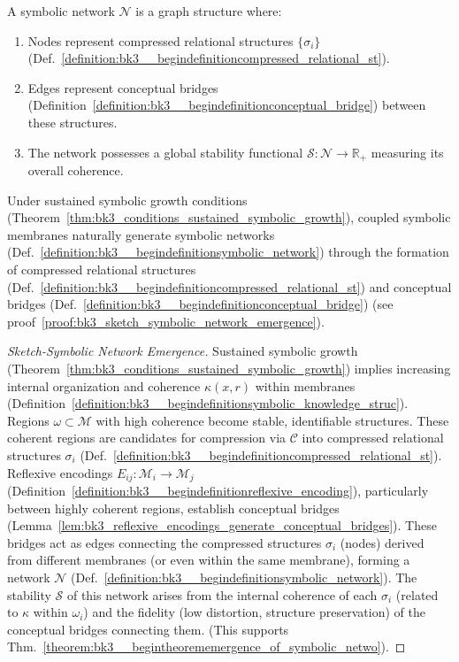 \begin{definition} \label{definition:bk3__begindefinitionsymbolic_network}
A symbolic network $\mathcal{N}$ is a graph structure where:
\begin{enumerate}
    \item Nodes represent compressed relational structures $\{\sigma_i\}$ (Def.~\ref{definition:bk3__begindefinitioncompressed_relational_st}).
    \item Edges represent conceptual bridges (Definition~\ref{definition:bk3__begindefinitionconceptual_bridge}) between these structures.
    \item The network possesses a global stability functional $\mathcal{S}: \mathcal{N} \rightarrow \mathbb{R}_+$ measuring its overall coherence.
\end{enumerate}
\end{definition}

\begin{theorem} \label{theorem:bk3__begintheorememergence_of_symbolic_netwo}
Under sustained symbolic growth conditions (Theorem~\ref{thm:bk3_conditions_sustained_symbolic_growth}), coupled symbolic membranes naturally generate symbolic networks (Def.~\ref{definition:bk3__begindefinitionsymbolic_network}) through the formation of compressed relational structures (Def.~\ref{definition:bk3__begindefinitioncompressed_relational_st}) and conceptual bridges (Def.~\ref{definition:bk3__begindefinitionconceptual_bridge}) (see proof~\ref{proof:bk3_sketch_symbolic_network_emergence}).
\end{theorem}

\begin{proof}[Sketch-Symbolic Network Emergence]
\label{proof:bk3_sketch_symbolic_network_emergence}
Sustained symbolic growth (Theorem~\ref{thm:bk3_conditions_sustained_symbolic_growth}) implies increasing internal organization and coherence $\kappa(x,r)$ within membranes (Definition~\ref{definition:bk3__begindefinitionsymbolic_knowledge_struc}). Regions $\omega \subset \mathcal{M}$ with high coherence become stable, identifiable structures. These coherent regions are candidates for compression via $\mathcal{C}$ into compressed relational structures $\sigma_i$ (Def.~\ref{definition:bk3__begindefinitioncompressed_relational_st}). Reflexive encodings $E_{ij}: \mathcal{M}_i \rightarrow \mathcal{M}_j$ (Definition~\ref{definition:bk3__begindefinitionreflexive_encoding}), particularly between highly coherent regions, establish conceptual bridges (Lemma~\ref{lem:bk3_reflexive_encodings_generate_conceptual_bridges}). These bridges act as edges connecting the compressed structures $\sigma_i$ (nodes) derived from different membranes (or even within the same membrane), forming a network $\mathcal{N}$ (Def.~\ref{definition:bk3__begindefinitionsymbolic_network}). The stability $\mathcal{S}$ of this network arises from the internal coherence of each $\sigma_i$ (related to $\kappa$ within $\omega_i$) and the fidelity (low distortion, structure preservation) of the conceptual bridges connecting them. (This supports Thm.~\ref{theorem:bk3__begintheorememergence_of_symbolic_netwo}).
\end{proof}

